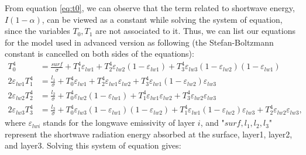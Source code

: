\documentclass[a4paper,12pt]{article}
\begin{document}
From equation \ref{eq:t0}, we can observe that the term related to shortwave energy, $I(1-\alpha)$, can be viewed as a constant while solving the system of equation, since the variables $T_0,T_1$ are not associated to it. Thus, we can list our equations for the model used in advanced version as following (the Stefan-Boltzmann constant is cancelled on both sides of the equations): 
\begin{align*}
    T_0^4&= \frac{surf}{\sigma} + T_1^4\varepsilon_{lw1} + T_2^4\varepsilon_{lw2}(1-\varepsilon_{lw1}) + T_3^4\varepsilon_{lw3}(1-\varepsilon_{lw2})(1-\varepsilon_{lw1}) \\
 2\varepsilon_{lw1}T_1^4&=\frac{l_1}{\sigma} + T_0^4\varepsilon_{lw1} + T_2^4\varepsilon_{lw1}\varepsilon_{lw2} + T_3^4\varepsilon_{lw1}(1-\varepsilon_{lw2})\varepsilon_{lw3}\\
2\varepsilon_{lw2}T_2^4 &= \frac{l_2}{\sigma} + T_0^4\varepsilon_{lw2}(1-\varepsilon_{lw1}) + T_1^4\varepsilon_{lw1}\varepsilon_{lw2} + T_3^4\varepsilon_{lw2}\varepsilon_{lw3}\\
2\varepsilon_{lw3}T_3^4&= \frac{l_3}{\sigma} + T_0^4\varepsilon_{lw3}(1-\varepsilon_{lw1})(1-\varepsilon_{lw2}) + T_1^4\varepsilon_{lw1}(1-\varepsilon_{lw2})\varepsilon_{lw3}  + T_2^4\varepsilon_{lw2}\varepsilon_{lw3},
\end{align*}
where $\varepsilon_{lwi}$ stands for the longwave emissivity of layer $i$, and "$surf, l_1, l_2, l_3$" represent the shortwave radiation energy absorbed at the surface, layer1, layer2, and layer3.
Solving this system of equation gives:
\end{document}
